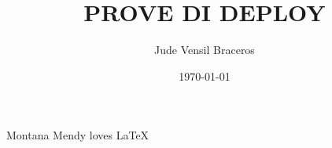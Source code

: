 \documentclass{article}
\title{PROVE DI DEPLOY}
\author{Jude Vensil Braceros}
\date{\today}
\begin{document}
\maketitle

Montana Mendy loves LaTeX
\end{document}
